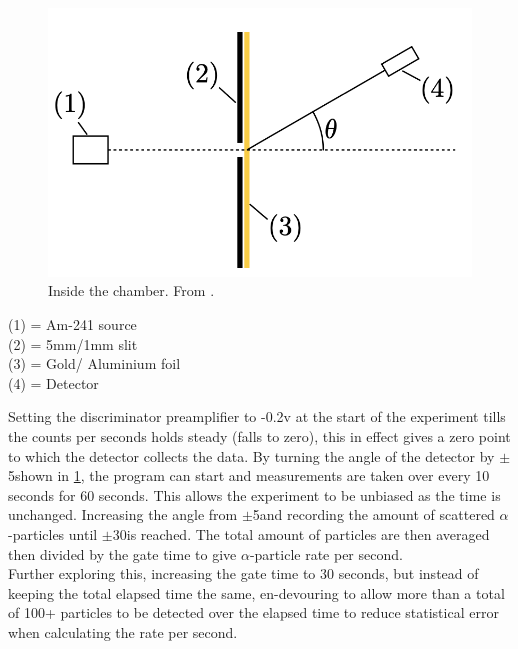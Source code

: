 \documentclass[12pt]{article}
\begin{document}
\begin{multicols}{2}
\begin{figure}[H]
\centering
\includegraphics[scale=0.5]{Images/four.png}
\caption{Inside the chamber. From \cite{Exp.6-2019}\cite{Two}.}
\label{Inside the chamber}
\end{figure}


(1) = Am-241 source \\
(2) = 5mm/1mm slit \\
(3) = Gold/ Aluminium foil \\
(4) = Detector
\end{multicols}

Setting the discriminator preamplifier to -0.2v at the start of the experiment tills the counts per seconds holds steady (falls to zero), this in effect gives a zero point to which the detector collects the data. By turning the angle of the detector by $\pm$5\textdegree shown in \cref{Inside the chamber}, the program can start and measurements are taken over every 10 seconds for 60 seconds. This allows the experiment to be unbiased as the time is unchanged. Increasing the angle from $\pm$5\textdegree and recording the amount of scattered $\alpha$-particles until $\pm$30\textdegree is reached. The total amount of particles are then averaged then divided by the gate time to give $\alpha$-particle rate per second. \\

Further exploring this, increasing the gate time to 30 seconds, but instead of keeping the total elapsed time the same, en-devouring to allow more than a total of 100+ particles to be detected over the elapsed time to reduce statistical error when calculating the rate per second.

\end{document}
